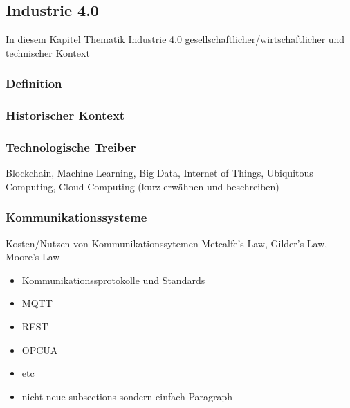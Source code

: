 \subsection{Industrie 4.0}
In diesem Kapitel Thematik Industrie 4.0 gesellschaftlicher/wirtschaftlicher und technischer Kontext
\subsubsection{Definition}
\subsubsection{Historischer Kontext}


\subsubsection{Technologische Treiber}
Blockchain, Machine Learning, Big Data, Internet of Things, Ubiquitous Computing, Cloud Computing (kurz erwähnen und beschreiben)
\subsubsection{Kommunikationssysteme}
Kosten/Nutzen von Kommunikationssytemen
Metcalfe’s Law, Gilder’s Law, Moore’s Law
\begin{itemize}
  \item Kommunikationssprotokolle und Standards
  \item MQTT
  \item REST
  \item OPCUA
  \item etc
  \item nicht neue subsections sondern einfach Paragraph
\end{itemize}
